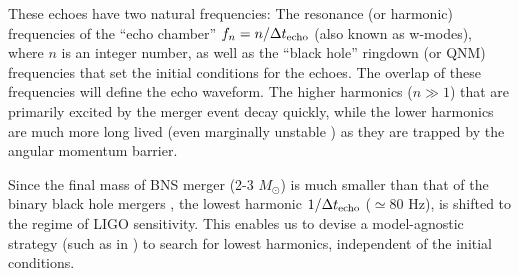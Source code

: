 \documentclass[a4paper,11pt]{article}
\begin{document}
These echoes have two natural frequencies: The resonance (or harmonic) frequencies of the ``echo chamber'' $f_{n} = n/\Delta t_{\rm echo}$ (also known as w-modes), where $n$ is an integer number, as well as the ``black hole'' ringdown (or QNM) frequencies that set the initial conditions for the echoes. The overlap of these frequencies will define the echo waveform. The higher harmonics ($n\gg 1$) that are primarily excited by the merger event decay quickly, while the lower harmonics are much more long lived (even marginally unstable \cite{Maggio:2017ivp,Bueno:2017hyj,Wang:2018gin}) as they are trapped by the angular momentum barrier. %

Since the final mass of BNS merger (2-3 $M_{\odot}$) is much smaller than that of the binary black hole mergers \cite{Abedi:2016hgu}, the lowest harmonic $ 1/\Delta t_{\rm echo}$ ($\simeq 80$ Hz), is shifted to the regime of LIGO sensitivity. This enables us to devise a model-agnostic strategy (such as in \cite{Conklin:2017lwb}) to search for lowest harmonics, independent of the initial conditions. %
\end{document}
